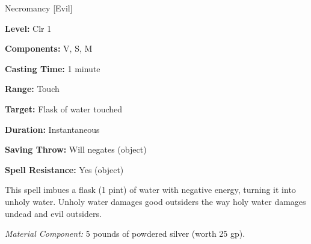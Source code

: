 
Necromancy [Evil]

\textbf{Level:} Clr 1

\textbf{Components:} V, S, M

\textbf{Casting Time:} 1 minute

\textbf{Range:} Touch

\textbf{Target:} Flask of water touched

\textbf{Duration:} Instantaneous

\textbf{Saving Throw:} Will negates (object)

\textbf{Spell Resistance:} Yes (object)

This spell imbues a flask (1 pint) of water with negative energy, turning it into 
unholy water. Unholy water damages good outsiders the way holy water damages undead 
and evil outsiders.

\textit{Material Component:} 5 pounds of powdered silver (worth 25 gp).





